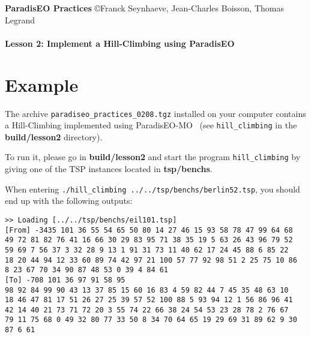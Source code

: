 \documentclass[a4paper]{article}
\begin{document}
\textbf{ParadisEO Practices}  {\copyright Franck Seynhaeve,
Jean-Charles Boisson, Thomas Legrand} \Large{\textbf{\\\\
Lesson 2: Implement a Hill-Climbing using ParadisEO}}

\normalsize

\vspace{-0,3cm}

\section{Example}

    The archive {\tt paradiseo\_practices\_0208.tgz} installed
    on your computer contains a Hill-Climbing implemented using ParadisEO-MO~
    (see {\tt hill\_climbing} in the {\bf build/lesson2} directory).

    \medskip
    To run it, please go in {\bf build/lesson2} and start the program {\tt hill\_climbing} by giving
    one of the TSP instances located in {\bf tsp/benchs}.


    \medskip
    When entering {\tt ./hill\_climbing ../../tsp/benchs/berlin52.tsp}, you should end up with the
    following outputs:

    \smallskip
    \noindent
    \texttt{>> Loading [../../tsp/benchs/eil101.tsp]} \\
    \texttt{[From] -3435  101 36 55 54 65 50 80 14 27 46 15 93 58 78 47 99 64 68}\\
    \texttt{49 72 81 82 76 41 16 66 30 29 83 95 71 38 35 19 5 63 26 43 96 79 52}\\
    \texttt{59 69 7 56 37 3 32 28 9 13 1 91 31 73 11 40 62 17 24 45 88 6 85 22}\\
    \texttt{18 20 44 94 12 33 60 89 74 42 97 21 100 57 77 92 98 51 2 25 75 10 86}\\
    \texttt{8 23 67 70 34 90 87 48 53 0 39 4 84 61}\\
    \texttt{[To] -708  101 36 97 91 58 95}\\
    \texttt{98 92 84 99 90 43 13 37 85 15 60 16 83 4 59 82 44 7 45 35 48 63 10}\\
    \texttt{18 46 47 81 17 51 26 27 25 39 57 52 100 88 5 93 94 12 1 56 86 96 41}\\
    \texttt{42 14 40 21 73 71 72 20 3 55 74 22 66 38 24 54 53 23 28 78 2 76 67}\\
    \texttt{79 11 75 68 0 49 32 80 77 33 50 8 34 70 64 65 19 29 69 31 89 62 9 30}\\
    \texttt{87 6 61}\\
\end{document}
